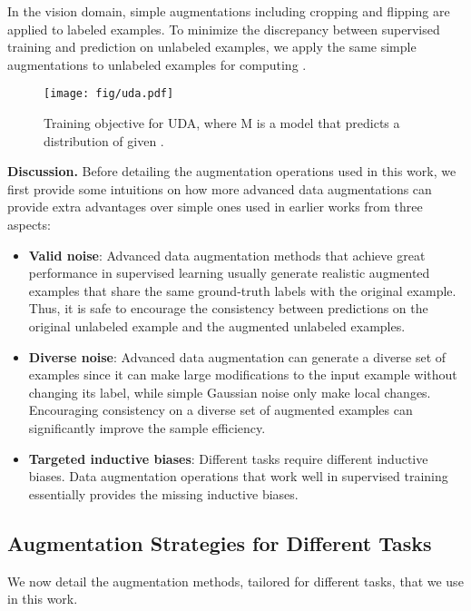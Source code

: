 \documentclass{article}
\def\name{UDA\xspace}
\begin{document}
In the vision domain, simple augmentations including cropping and flipping are applied to labeled examples. To minimize the discrepancy between supervised training and prediction on unlabeled examples, we apply the same simple augmentations to unlabeled examples for computing .

\begin{figure}
\vspace{-3em}
    \centering
    \texttt{[image: fig/uda.pdf]}
    \caption{Training objective for \name, where M is a model that predicts a distribution of  given .}
    \label{fig:illustration}
\vspace{-1em}
\end{figure}


\textbf{Discussion.}
Before detailing the augmentation operations used in this work, we first provide some intuitions on how more advanced data augmentations can provide extra advantages over simple ones used in earlier works from three aspects: 
\begin{itemize}[leftmargin=*,itemsep=0em,topsep=0em]
\item \textbf{Valid noise}: Advanced data augmentation methods that achieve great performance in supervised learning usually generate realistic augmented examples that share the same ground-truth labels with the original example.
Thus, it is safe to encourage the consistency between predictions on the original unlabeled example and the augmented unlabeled examples.

\item \textbf{Diverse noise}: Advanced data augmentation can generate a diverse set of examples since it can make large modifications to the input example without changing its label, while simple Gaussian noise only make local changes. Encouraging consistency on a diverse set of augmented examples can significantly improve the sample efficiency. 

\item \textbf{Targeted inductive biases}: Different tasks require different inductive biases. Data augmentation operations that work well in supervised training essentially provides the missing inductive biases.
\end{itemize}

\vspace{-0.3em}
\subsection{Augmentation Strategies for Different Tasks} 
\vspace{-0.3em}
\label{sec:data_aug_for_task}
We now detail the augmentation methods, tailored for different tasks, that we use in this work.
\end{document}

